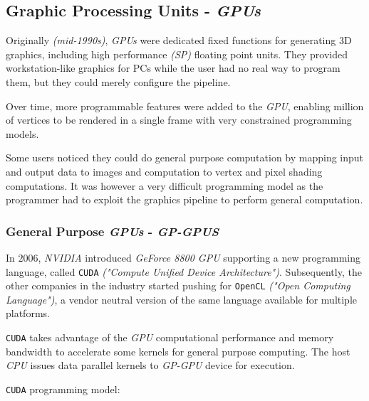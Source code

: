 \documentclass[english]{article}
\begin{document}
\subsection{Graphic Processing Units - \textit{GPUs}}

Originally \textit{(mid-1990s)}, \textit{GPUs} were dedicated fixed functions for generating 3D graphics, including high performance \textit{(SP)} floating point units.
They provided workstation-like graphics for PCs while the user had no real way to program them, but they could merely configure the pipeline.

Over time, more programmable features were added to the \textit{GPU}, enabling million of vertices to be rendered in a single frame with very constrained programming models.

Some users noticed they could do general purpose computation by mapping input and output data to images and computation to vertex and pixel shading computations.
It was however a very difficult programming model as the programmer had to exploit the graphics pipeline to perform general computation.

\subsubsection{General Purpose \textit{GPUs} - \textit{GP-GPUS}}

In \(2006\), \textit{NVIDIA} introduced \textit{GeForce 8800 GPU} supporting a new programming language, called \texttt{CUDA} \textit{("Compute Unified Device Architecture")}.
Subsequently, the other companies in the industry started pushing for \texttt{OpenCL} \textit{("Open Computing Language")}, a vendor neutral version of the same language available for multiple platforms.

\texttt{CUDA} takes advantage of the \textit{GPU} computational performance and memory bandwidth to accelerate some kernels for general purpose computing.
The host \textit{CPU} issues data parallel kernels to \textit{GP-GPU} device for execution.

\bigskip
\texttt{CUDA} programming model:
\end{document}
